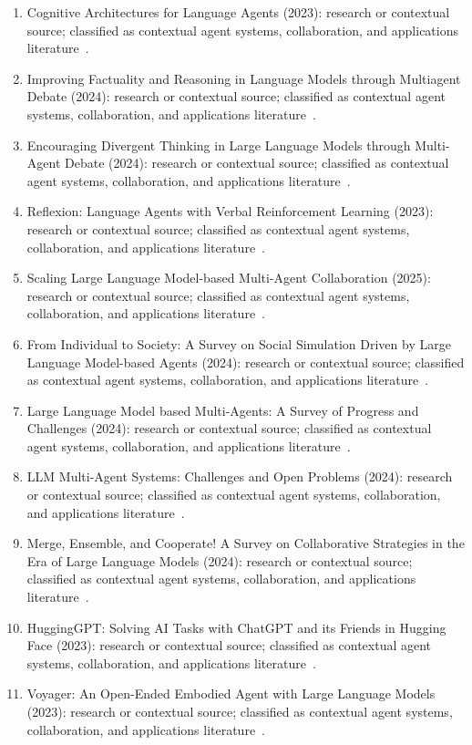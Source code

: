 \begin{enumerate}
\item Cognitive Architectures for Language Agents (2023): research or contextual source; classified as contextual agent systems, collaboration, and applications literature~\cite{ext068}.
\item Improving Factuality and Reasoning in Language Models through Multiagent Debate (2024): research or contextual source; classified as contextual agent systems, collaboration, and applications literature~\cite{ext069}.
\item Encouraging Divergent Thinking in Large Language Models through Multi-Agent Debate (2024): research or contextual source; classified as contextual agent systems, collaboration, and applications literature~\cite{ext070}.
\item Reflexion: Language Agents with Verbal Reinforcement Learning (2023): research or contextual source; classified as contextual agent systems, collaboration, and applications literature~\cite{ext071}.
\item Scaling Large Language Model-based Multi-Agent Collaboration (2025): research or contextual source; classified as contextual agent systems, collaboration, and applications literature~\cite{ext074}.
\item From Individual to Society: A Survey on Social Simulation Driven by Large Language Model-based Agents (2024): research or contextual source; classified as contextual agent systems, collaboration, and applications literature~\cite{ext076}.
\item Large Language Model based Multi-Agents: A Survey of Progress and Challenges (2024): research or contextual source; classified as contextual agent systems, collaboration, and applications literature~\cite{ext077}.
\item {LLM} Multi-Agent Systems: Challenges and Open Problems (2024): research or contextual source; classified as contextual agent systems, collaboration, and applications literature~\cite{ext078}.
\item Merge, Ensemble, and Cooperate! A Survey on Collaborative Strategies in the Era of Large Language Models (2024): research or contextual source; classified as contextual agent systems, collaboration, and applications literature~\cite{ext079}.
\item {HuggingGPT}: Solving {AI} Tasks with {ChatGPT} and its Friends in {Hugging Face} (2023): research or contextual source; classified as contextual agent systems, collaboration, and applications literature~\cite{ext080}.
\item Voyager: An Open-Ended Embodied Agent with Large Language Models (2023): research or contextual source; classified as contextual agent systems, collaboration, and applications literature~\cite{ext081}.

\end{enumerate}
